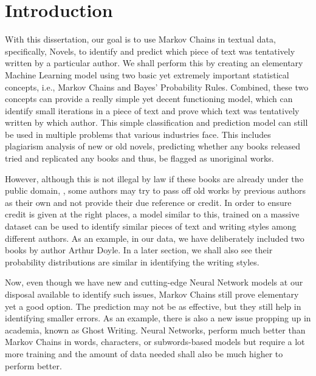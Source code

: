\chapter{Introduction} %
\label{cha:introduction} %

With this dissertation, our goal is to use Markov Chains in textual data, specifically, Novels, to identify and predict which piece of text was tentatively written by a particular author. We shall perform this by creating an elementary Machine Learning model using two basic yet extremely important statistical concepts, i.e., Markov Chains and Bayes' Probability Rules. Combined, these two concepts can provide a really simple yet decent functioning model, which can identify small iterations in a piece of text and prove which text was tentatively written by which author. This simple classification and prediction model can still be used in multiple problems that various industries face. This includes plagiarism analysis of new or old novels, predicting whether any books released tried and replicated any books and thus, be flagged as unoriginal works.

However, although this is not illegal by law if these books are already under the public domain, \textcite{murky-world-plagiarism}, some authors may try to pass off old works by previous authors as their own and not provide their due reference or credit. In order to ensure credit is given at the right places, a model similar to this, trained on a massive dataset can be used to identify similar pieces of text and writing styles among different authors. As an example, in our data, we have deliberately included two books by author Arthur Doyle. In a later section, we shall also see their probability distributions are similar in identifying the writing styles.

Now, even though we have new and cutting-edge Neural Network models at our disposal available to identify such issues, Markov Chains still prove elementary yet a good option. The prediction may not be as effective, but they still help in identifying smaller errors. As an example, there is also a new issue propping up in academia, known as Ghost Writing. Neural Networks, perform much better than Markov Chains in words, characters, or subwords-based models but require a lot more training and the amount of data needed shall also be much higher to perform better. 


